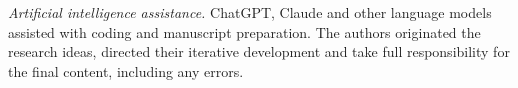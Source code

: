 \par\smallskip\noindent\textit{Artificial intelligence assistance.}\enspace
ChatGPT, Claude and other language models assisted with coding and manuscript preparation. The authors originated the research ideas, directed their iterative development and take full responsibility for the final content, including any errors.
